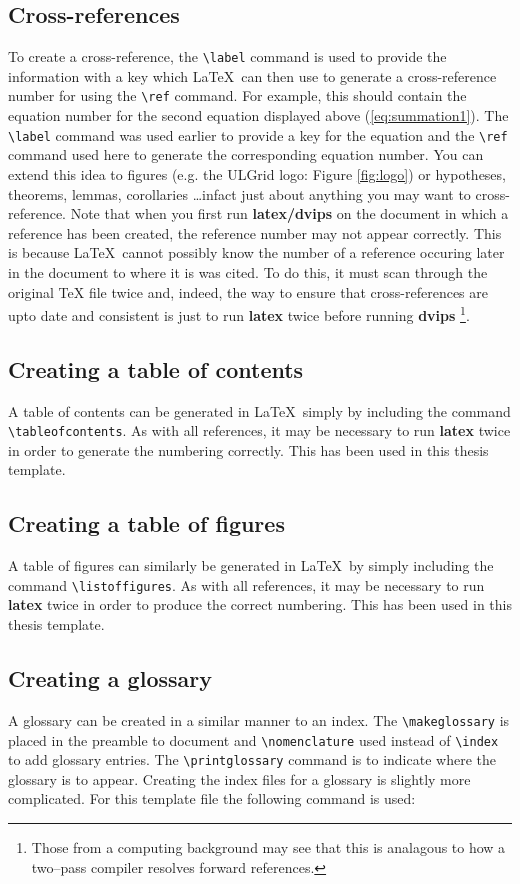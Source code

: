 \documentclass[11pt,oneside]{book}
\begin{document}
\subsection{Cross-references}
To create
a cross-reference, the 
\verb+\label+ command is used to provide the information
with a key which \LaTeX \ can then use to generate a cross-reference 
number for using the
\verb+\ref+ command. For example, this should
contain the equation number for the second equation displayed above (\ref{eq:summation1}).
The \verb+\label+ command was used earlier to provide a key for the equation
and the \verb+\ref+ command used here to generate the corresponding equation number.
You can extend this idea to figures (e.g. the ULGrid logo: Figure \ref{fig:logo})
or hypotheses, theorems, lemmas, corollaries \ldots infact just about
anything you may want to cross-reference. Note that when you first run
{\bf latex/dvips} on the document in which a reference has been created, the
reference number may not appear correctly. This is because \LaTeX \ cannot
possibly know the number of a reference occuring later in the document to
where it is was cited. To do this, it must scan through the original TeX
file twice and, indeed, the way to ensure that cross-references are upto date
and consistent is just to run {\bf latex} twice before running {\bf dvips}
\footnote{Those from a computing background may see that this is analagous
to how a two--pass compiler resolves forward references.}.

\subsection{Creating a table of contents}
A table of contents can be generated in \LaTeX \ simply by including
the command \verb+\tableofcontents+. As with all references, it may be
necessary to run {\bf latex} twice in order to generate the numbering
correctly. This has been used in this thesis template.

\subsection{Creating a table of figures}
A table of figures can similarly be generated in \LaTeX \ by simply including
the command \verb+\listoffigures+. As with all references, it may be
necessary to run {\bf latex} twice in order to produce the correct numbering.
This has been used in this thesis template.

\subsection{Creating a glossary}
A glossary can be created in a similar manner to an index. The 
\verb+\makeglossary+ is placed in the preamble to document and
\verb+\nomenclature+ used instead of \verb+\index+ to add
glossary entries. The \verb+\printglossary+ command is to indicate
where the glossary is to appear. Creating the index files for a glossary
is slightly more complicated. For this template file the following command
is used:
\end{document}
